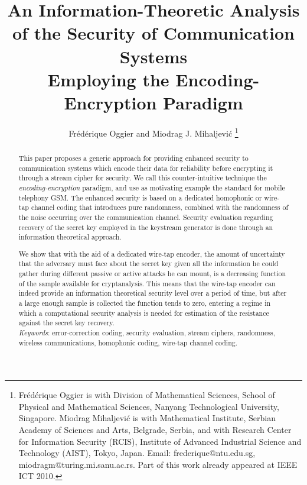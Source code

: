 \documentclass{article}[11pt]
\begin{document}
\title{
An Information-Theoretic Analysis \\
of the Security of Communication Systems \\
Employing the Encoding-Encryption Paradigm
}
\author
{Fr\'ed\'erique Oggier and Miodrag J. Mihaljevi\'c
\thanks{
Fr\'ed\'erique Oggier is with Division of Mathematical Sciences,
School of Physical and Mathematical Sciences, Nanyang
Technological University, Singapore. Miodrag Mihaljevi\'c is with
Mathematical Institute, Serbian Academy of Sciences and Arts,
Belgrade, Serbia, and with Research Center for Information
Security (RCIS), Institute of Advanced Industrial Science and
Technology (AIST), Tokyo, Japan.  Email: frederique@ntu.edu.sg,
miodragm@turing.mi.sanu.ac.rs. Part of this work already appeared
at IEEE ICT 2010. } } \maketitle

\begin{abstract}
This paper proposes a generic approach for providing enhanced
security to communication systems which encode their data for
reliability before encrypting it through a stream cipher for
security. We call this counter-intuitive technique the {\em
encoding-encryption} paradigm, and use as motivating example the
standard for mobile telephony GSM. The enhanced security is based
on a dedicated homophonic or wire-tap channel coding that
introduces pure randomness, combined with the randomness of the
noise occurring over the communication channel. Security
evaluation regarding recovery of the secret key employed in the
keystream generator is done through an information theoretical
approach.

We show that with the aid of a dedicated wire-tap encoder, the
amount of uncertainty that the adversary must face about the
secret key given all the information he could gather during
different passive or active attacks he can mount, is a decreasing
function of the sample available for cryptanalysis. This means
that the wire-tap encoder can indeed provide an information
theoretical security level over a period of time, but after a
large enough sample is collected the function tends to zero,
entering a regime in which a computational security analysis is
needed for estimation of the resistance against the secret key
recovery.
\\
{\em Keywords}: error-correction coding, security evaluation,
stream ciphers, randomness, wireless communications, homophonic
coding, wire-tap channel coding.
\end{abstract}
\end{document}
